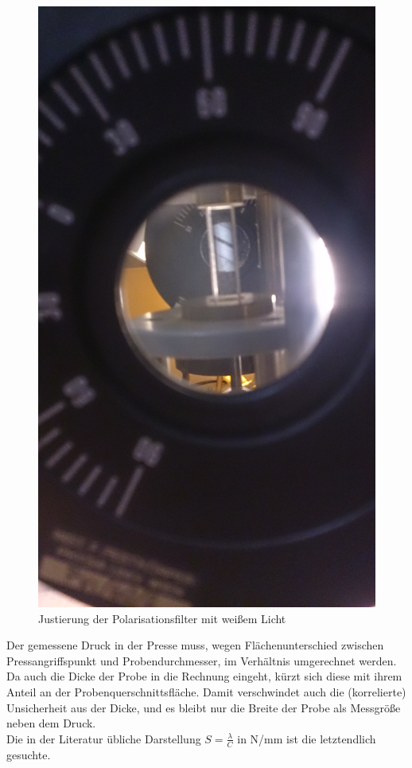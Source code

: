 \documentclass[12pt,a4paper]{article}
\begin{document}
\begin{multicols}{2}
\begin{figure}[H]
	\centering
	\includegraphics[scale=0.065,angle=-90]{./data/PS5_2_Filterjustierung.jpg}
	\caption{Justierung der Polarisationsfilter mit weißem Licht}
	\label{fig:spannung_justierung}
\end{figure}



Der gemessene Druck in der Presse muss, wegen Flächenunterschied zwischen Pressangriffspunkt und Probendurchmesser, im Verhältnis umgerechnet werden. Da auch die Dicke der Probe in die Rechnung eingeht, kürzt sich diese mit ihrem Anteil an der Probenquerschnittsfläche. Damit verschwindet auch die (korrelierte) Unsicherheit aus der Dicke, und es bleibt nur die Breite der Probe als Messgröße neben dem Druck.\\
Die in der Literatur übliche Darstellung $S= \frac{\lambda}{C}$ in N/mm ist die letztendlich gesuchte.



\end{multicols}
\end{document}
